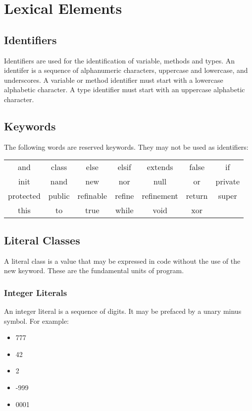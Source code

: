 \section{Lexical Elements}
\subsection{Identifiers}
Identifiers are used for the identification of variable,  methods and types. An identifer is a sequence of alphanumeric characters, uppercase and lowercase, and underscores. A variable or method identifier must start with a lowercase alphabetic character. A type identifier must start with an uppercase alphabetic character.

\subsection{Keywords}
The following words are reserved keywords. They may not be used as identifiers:
\begin{center}
\begin{tabular}{ccccccc}
and & class & else & elsif & extends & false & if\\
init & nand & new & nor & null & or & private\\
protected & public & refinable & refine & refinement & return & super\\
this & to & true & while & void & xor\\
\end{tabular}
\end{center}

\subsection{Literal Classes}
A literal class is a value that may be expressed in code without the use of the new keyword. These are the fundamental units of program.

\subsubsection{Integer Literals}
An integer literal is a sequence of digits. It may be prefaced by a unary minus symbol. For example:
\begin{itemize}
\item 777
\item 42
\item 2
\item -999
\item 0001
\end{itemize}

